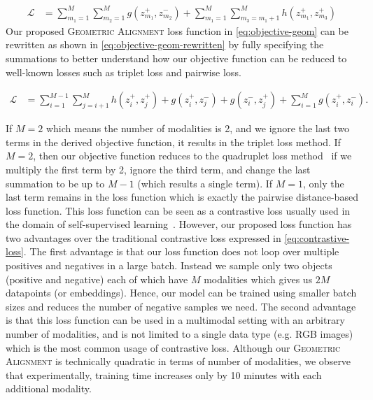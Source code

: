 \documentclass[10pt]{article} %
\newcommand{\geom}{\textsc{Geometric Alignment}}
\begin{document}
\begin{equation}\label{eq:objective-geom}
\begin{split}
    \mathcal{L} & = \sum_{m_1=1}^{M}  \sum_{m_2=1}^{M} g(z_{m_1}^{+}, z_{m_2}^{-})  + \sum_{m_1=1}^{M} \sum_{m_3=m_1+1}^{M} h(z_{m_1}^{+},z_{m_3}^{+})
\end{split}    
\end{equation}
Our proposed \geom{} loss function in \cref{eq:objective-geom} can be rewritten as shown in \cref{eq:objective-geom-rewritten} by fully specifying the summations to better understand how our objective function can be reduced to well-known losses such as triplet loss and pairwise loss.

\begin{equation}\label{eq:objective-geom-rewritten}
\begin{split}
     \mathcal{L} &= \sum_{i=1}^{M-1} \sum_{j=i+1}^{M} h( z_{i}^{+} , z_{j}^{+})
     + g( z_{i}^{+} , z_{j}^{-}) + g( z_{i}^{-} , z_{j}^{+}) + \sum_{i=1}^{M} g( z_{i}^{+} , z_{i}^{-} ).
\end{split}
\end{equation}



If $M=2$ which means the number of modalities is 2, and we ignore the last two terms in the derived objective function, it results in the triplet loss method. 
If $M=2$, then our objective function reduces to the quadruplet loss method~\citep{tursun2021efficient,chen2017beyond} if we multiply the first term by 2, ignore the third term, and change the last summation to be up to $M-1$ (which results a single term). 
If $M=1$, only the last term remains in the loss function which is exactly the pairwise distance-based loss function.
This loss function can be seen as a contrastive loss usually used in the domain of self-supervised learning~\citep{chen2020simple}. However, our proposed loss function has two advantages over the traditional contrastive loss expressed in \cref{eq:contrastive-loss}. The first advantage is that our loss function does not loop over multiple positives and negatives in a large batch. Instead we sample only two objects (positive and negative) each of which have $M$ modalities which gives us $2M$ datapoints (or embeddings). Hence, our model can be trained using smaller batch sizes and reduces the number of negative samples we need. The second advantage is that this loss function can be used in a multimodal setting with an arbitrary number of modalities, and is not limited to a single data type (e.g. RGB images) which is the most common usage of contrastive loss.
Although our \geom{} is technically quadratic in terms of number of modalities, we observe that experimentally, training time increases only by 10 minutes with each additional modality.
\end{document}
